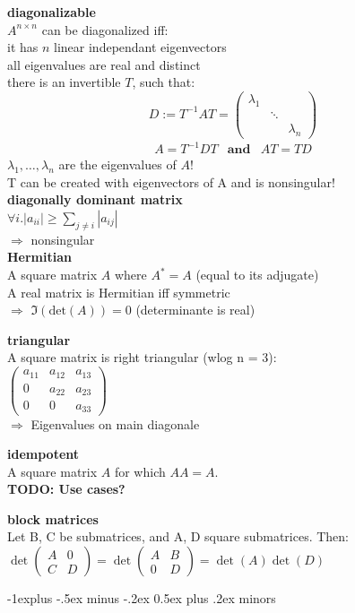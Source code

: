 \documentclass[10pt,landscape]{scrartcl}
\makeatletter
\renewcommand{\subsection}{\@startsection{subsection}{2}{0mm}%
                                {-1explus -.5ex minus -.2ex}%
                                {0.5ex plus .2ex}%
                                {\normalfont\normalsize\bfseries}}
\newcommand{\sect}[1]{\vspace{1mm}\textbf{#1}\\}
\makeatother
\begin{document}
\begin{multicols}{3}
\sect{diagonalizable}
$A^{n \times n}$ can be diagonalized iff:\\
\quad it has $n$ linear independant eigenvectors\\
\quad all eigenvalues are real and distinct\\
\quad there is an invertible $T$, such that:
\[
D := T^{-1}AT=\begin{pmatrix}\lambda_{1}\\
& \ddots\\
& & \lambda_{n}\end{pmatrix}
\]
\[
\begin{array}{ccc}
A = T^{-1}DT & \mathbf{and} & AT=TD
\end{array}
\]
$\lambda_1,\dots,\lambda_n$ are the eigenvalues of $A$!\\
T can be created with eigenvectors of A and is nonsingular!\\

\sect{diagonally dominant matrix}
$\forall i. |a_{ii}| \geq \sum_{j\neq i} |a_{ij}| \quad$\\
$\Rightarrow$ nonsingular\\


\sect{Hermitian}
A square matrix $A$ where $A^* = A$ (equal to its adjugate)\\
A real matrix is Hermitian iff symmetric\\
$\Rightarrow$ $\Im(\text{det}(A)) = 0$ (determinante is real)


\sect{triangular}
A square matrix is right triangular (wlog n = 3):\\
$\begin{pmatrix} 
a_{11} & a_{12} & a_{13} \\
0 & a_{22} & a_{23} \\
0 & 0 & a_{33}
\end{pmatrix}$\\
$\Rightarrow$ Eigenvalues on main diagonale


\sect{idempotent}
A square matrix $A$ for which $AA = A$. \\
 \textbf{TODO: Use cases?}


\sect{block matrices}
Let B, C be submatrices, and A, D square submatrices. Then:\\
$\det\begin{pmatrix}A& 0\\ C& D\end{pmatrix} = \det\begin{pmatrix}A& B\\ 0& D\end{pmatrix} = \det(A) \det(D)$

\subsection{minors}

\end{multicols}
\end{document}

